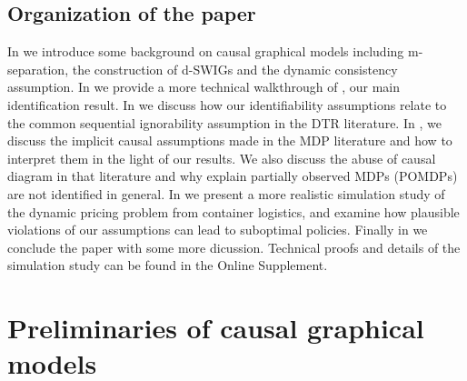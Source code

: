 \documentclass[12pt,a4paper]{article}
\theoremstyle{definition}
\newcommand{\E}[0]{\mathbb{E}}
\newcommand{\PP}[0]{\mathbb{P}}
\begin{document}
\subsection{Organization of the paper}
In  we introduce some background on causal graphical
models including m-separation, the construction of d-SWIGs
\parencite{richardson_single_2013} and the dynamic
  consistency assumption. In  we provide a more
  technical walkthrough of , our main
  identification result. In
 we discuss how our identifiability assumptions relate
to the common sequential ignorability assumption in the DTR
literature. In , we discuss the implicit causal
assumptions made in the MDP literature and how to interpret them in
the light of our results. We also discuss the abuse of
causal diagram in that literature and why explain partially observed
MDPs (POMDPs) are not identified in general. In
 we present a more realistic simulation
study of the dynamic pricing problem from container logistics, and
examine how plausible violations of our assumptions can lead to
suboptimal policies. Finally in  we conclude the
paper with some more dicussion. Technical proofs and details of the
simulation study can be found in the Online Supplement.




\section{Preliminaries of causal graphical models}\label{sec:prelim}


\end{document}
